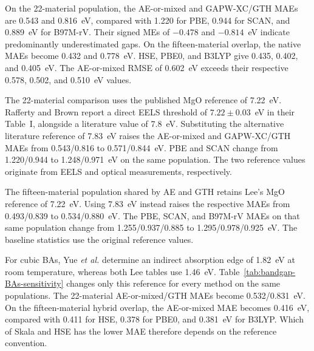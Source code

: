 \documentclass[10pt,a4paper]{article}
\begin{document}
On the 22-material population, the AE-or-mixed and GAPW-XC/GTH MAEs are 0.543 and 0.816~eV, compared with 1.220 for PBE, 0.944 for SCAN, and 0.889~eV for B97M-rV. Their signed MEs of $-0.478$ and $-0.814$~eV indicate predominantly underestimated gaps. On the fifteen-material overlap, the native MAEs become 0.432 and 0.778~eV. HSE, PBE0, and B3LYP give 0.435, 0.402, and 0.405~eV. The AE-or-mixed RMSE of 0.602~eV exceeds their respective 0.578, 0.502, and 0.510~eV values.

The 22-material comparison uses the published MgO reference of 7.22~eV.\cite{Lee2021Gaps} Rafferty and Brown report a direct EELS threshold of $7.22\pm0.03$~eV in their Table~I, alongside a literature value of 7.8~eV.\cite{Rafferty1998Gaps}  Substituting the alternative literature reference of 7.83~eV raises the AE-or-mixed and GAPW-XC/GTH MAEs from 0.543/0.816 to 0.571/0.844~eV. PBE and SCAN change from 1.220/0.944 to 1.248/0.971~eV on the same population. The two reference values originate from EELS and optical measurements, respectively.

The fifteen-material population shared by AE and GTH retains Lee's MgO reference of 7.22~eV. Using 7.83~eV instead raises the respective MAEs from 0.493/0.839 to 0.534/0.880~eV. The PBE, SCAN, and B97M-rV MAEs on that same population change from 1.255/0.937/0.885 to 1.295/0.978/0.925~eV. The baseline statistics use the original reference values.

For cubic BAs, Yue \emph{et al.} determine an indirect absorption edge of 1.82~eV at room temperature, whereas both Lee tables use 1.46~eV.\cite{Yue2020BAs} Table~\ref{tab:bandgap-BAs-sensitivity} changes only this reference for every method on the same populations. The 22-material AE-or-mixed/GTH MAEs become 0.532/0.831~eV. On the fifteen-material hybrid overlap, the AE-or-mixed MAE becomes 0.416~eV, compared with 0.411 for HSE, 0.378 for PBE0, and 0.381~eV for B3LYP. Which of Skala and HSE has the lower MAE therefore depends on the reference convention.
\end{document}
